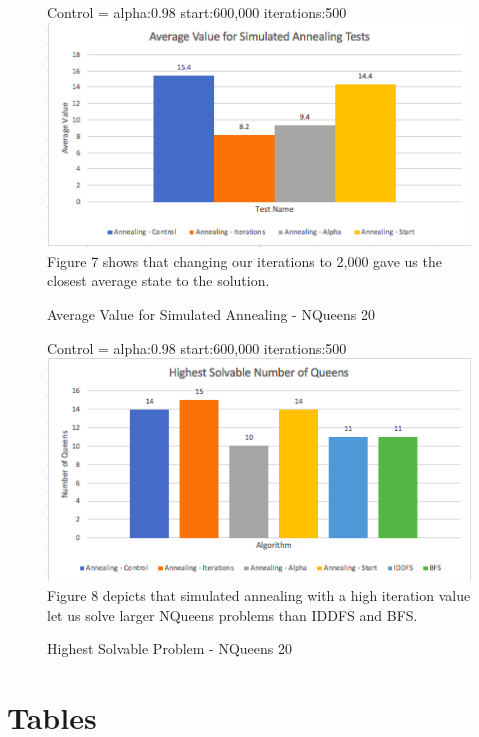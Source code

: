 \documentclass{article}
\begin{document}
\begin{figure}[!htb]
\caption{Average Value for Simulated Annealing - NQueens 20}
Control = alpha:0.98 start:600,000 iterations:500
\includegraphics[width=\textwidth]{AvgValue.png}
Figure 7 shows that changing our iterations to 2,000 gave us the closest average state to the solution.
\end{figure}

\begin{figure}[!htb]
\caption{Highest Solvable Problem - NQueens 20}
Control = alpha:0.98 start:600,000 iterations:500
\includegraphics[width=\textwidth]{HighestSolve.png}
Figure 8 depicts that simulated annealing with a high iteration value let us solve larger NQueens problems than IDDFS and BFS.
\end{figure}

\clearpage


\section{Tables}
\end{document}
